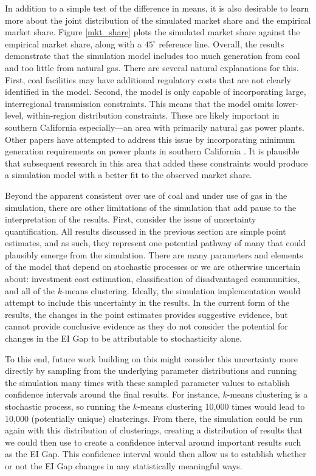 In addition to a simple test of the difference in means, it is also desirable to learn more about the joint distribution of the simulated market share and the empirical market share. Figure \ref{mkt_share} plots the simulated market share against the empirical market share, along with a $45^\circ$ reference line. Overall, the results demonstrate that the simulation model includes too much generation from coal and too little from natural gas. There are several natural explanations for this. First, coal facilities may have additional regulatory costs that are not clearly identified in the model. Second, the model is only capable of incorporating large, interregional transmission constraints. This means that the model omits lower-level, within-region distribution constraints. These are likely important in southern California especially---an area with primarily natural gas power plants. Other papers have attempted to address this issue by incorporating minimum generation requirements on power plants in southern California \citep{fowlie2021border}. It is plausible that subsequent research in this area that added these constraints would produce a simulation model with a better fit to the observed market share.

Beyond the apparent consistent over use of coal and under use of gas in the simulation, there are other limitations of the simulation that add pause to the interpretation of the results. First, consider the issue of uncertainty quantification. All results discussed in the previous section are simple point estimates, and as such, they represent one potential pathway of many that could plausibly emerge from the simulation. There are many parameters and elements of the model that depend on stochastic processes or we are otherwise uncertain about: investment cost estimation, classification of disadvantaged communities, and all of the $k$-means clustering. Ideally, the simulation implementation would attempt to include this uncertainty in the results. In the current form of the results, the changes in the point estimates provides suggestive evidence, but cannot provide conclusive evidence as they do not consider the potential for changes in the EI Gap to be attributable to stochasticity alone.

To this end, future work building on this might consider this uncertainty more directly by sampling from the underlying parameter distributions and running the simulation many times with these sampled parameter values to establish confidence intervals around the final results. For instance, $k$-means clustering is a stochastic process, so running the $k$-means clustering 10,000 times would lead to 10,000 (potentially unique) clusterings. From there, the simulation could be run again with this distribution of clusterings, creating a distribution of results that we could then use to create a confidence interval around important results such as the EI Gap. This confidence interval would then allow us to establish whether or not the EI Gap changes in any statistically meaningful ways.

